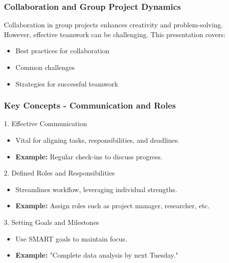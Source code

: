 \documentclass[aspectratio=169]{beamer}
\begin{document}
\begin{frame}[fragile]
    \frametitle{Collaboration and Group Project Dynamics}
    Collaboration in group projects enhances creativity and problem-solving. However, effective teamwork can be challenging. 
    This presentation covers:
    \begin{itemize}
        \item Best practices for collaboration
        \item Common challenges
        \item Strategies for successful teamwork
    \end{itemize}
\end{frame}

\begin{frame}[fragile]
    \frametitle{Key Concepts - Communication and Roles}
    \begin{block}{1. Effective Communication}
        \begin{itemize}
            \item Vital for aligning tasks, responsibilities, and deadlines.
            \item \textbf{Example:} Regular check-ins to discuss progress.
        \end{itemize}
    \end{block}
    
    \begin{block}{2. Defined Roles and Responsibilities}
        \begin{itemize}
            \item Streamlines workflow, leveraging individual strengths.
            \item \textbf{Example:} Assign roles such as project manager, researcher, etc.
        \end{itemize}
    \end{block}

    \begin{block}{3. Setting Goals and Milestones}
        \begin{itemize}
            \item Use SMART goals to maintain focus.
            \item \textbf{Example:} "Complete data analysis by next Tuesday."
        \end{itemize}
    \end{block}
\end{frame}
\end{document}
